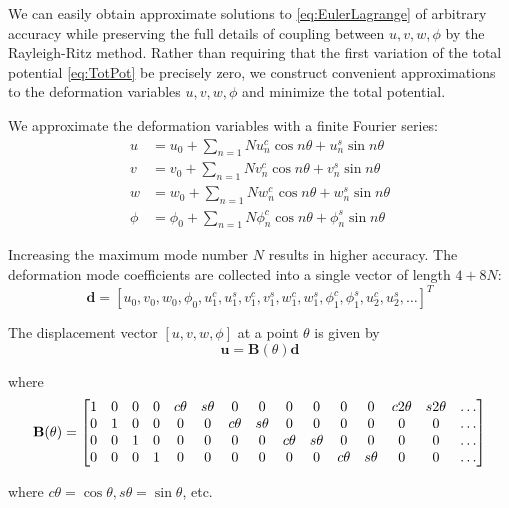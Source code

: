 \documentclass[\rootdir/thesis.tex]{subfiles}
\begin{document}
We can easily obtain approximate solutions to \eqref{eq:EulerLagrange} of arbitrary accuracy while preserving the full details of coupling between $u,v,w,\phi$ by the Rayleigh-Ritz method. Rather than requiring that the first variation of the total potential \eqref{eq:TotPot} be precisely zero, we construct convenient approximations to the deformation variables $u,v,w,\phi$ and minimize the total potential.

We approximate the deformation variables with a finite Fourier series:
\begin{align}
\label{eq:FourierDef}
u &= u_0 + \sum_{n=1}{N} u_n^c \cos{n\theta} + u_n^s \sin{n\theta}\\
v &= v_0 + \sum_{n=1}{N} v_n^c \cos{n\theta} + v_n^s \sin{n\theta}\\
w &= w_0 + \sum_{n=1}{N} w_n^c \cos{n\theta} + w_n^s \sin{n\theta}\\
\phi &= \phi_0 + \sum_{n=1}{N} \phi_n^c \cos{n\theta} + \phi_n^s \sin{n\theta}
\end{align}

Increasing the maximum mode number $N$ results in higher accuracy. The deformation mode coefficients are collected into a single vector of length $4+8N$:
\begin{equation}
\mathbf{d} = [u_0,v_0,w_0,\phi_0,u_1^c,u_1^s,v_1^c,v_1^s,w_1^c,w_1^s,\phi_1^c,\phi_1^s,u_2^c,u_2^s,\dots]^T
\end{equation}

The displacement vector $[u,v,w,\phi]$ at a point $\theta$ is given by
\begin{equation}
\label{eq:u_Bd}
\mathbf{u} = \mathbf{B}(\theta)\mathbf{d}
\end{equation}

where
\begin{equation}
\setcounter{MaxMatrixCols}{16}
\mathbf{B}(\theta) =
\begin{bmatrix}
1 & 0 & 0 & 0 & c\theta & s\theta & 0 & 0 & 0 & 0 & 0 & 0 & c2\theta & s2\theta & \dots\\
0 & 1 & 0 & 0 & 0 & 0 & c\theta & s\theta & 0 & 0 & 0 & 0 & 0 & 0 & \dots\\
0 & 0 & 1 & 0 & 0 & 0 & 0 & 0 & c\theta & s\theta & 0 & 0 & 0 & 0 & \dots\\
0 & 0 & 0 & 1 & 0 & 0 & 0 & 0 & 0 & 0 & c\theta & s\theta & 0 & 0 & \dots
\end{bmatrix}
\end{equation}

where $c\theta=\cos{\theta}, s\theta=\sin{\theta}$, etc.
\end{document}
